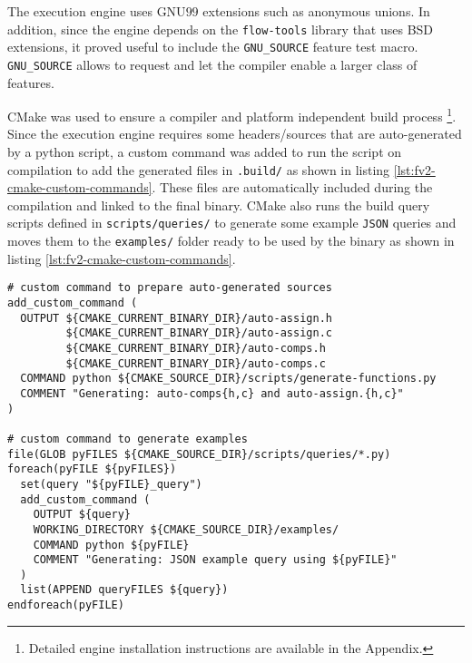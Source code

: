 The execution engine uses GNU$99$ extensions such as anonymous unions.  In
addition, since the engine depends on the \texttt{flow-tools} library that
uses BSD  extensions, it proved useful to
include the \texttt{GNU\_SOURCE} feature test macro.  \texttt{GNU\_SOURCE}
allows to request and let the compiler enable a larger class of features.

CMake \cite{masteringcmake:2008} was used to ensure a compiler and platform
independent build process \footnote{Detailed engine installation instructions
are available in the Appendix.}.  Since the execution engine requires some
headers/sources that are auto-generated by a python script, a custom command
was added to run the script on compilation to add the generated files
 in \texttt{.build/} as shown in listing
\ref{lst:fv2-cmake-custom-commands}. These files are automatically included
during the compilation and linked to the final binary.  CMake also runs the
build query scripts defined in \texttt{scripts/queries/} to generate some
example \texttt{JSON} queries and moves them to the \texttt{examples/} folder
ready to be used by the binary as shown in listing
\ref{lst:fv2-cmake-custom-commands}.

\begin{lstlisting}
# custom command to prepare auto-generated sources
add_custom_command (
  OUTPUT ${CMAKE_CURRENT_BINARY_DIR}/auto-assign.h
         ${CMAKE_CURRENT_BINARY_DIR}/auto-assign.c
         ${CMAKE_CURRENT_BINARY_DIR}/auto-comps.h
         ${CMAKE_CURRENT_BINARY_DIR}/auto-comps.c
  COMMAND python ${CMAKE_SOURCE_DIR}/scripts/generate-functions.py
  COMMENT "Generating: auto-comps{h,c} and auto-assign.{h,c}"
)

# custom command to generate examples
file(GLOB pyFILES ${CMAKE_SOURCE_DIR}/scripts/queries/*.py)
foreach(pyFILE ${pyFILES})
  set(query "${pyFILE}_query")
  add_custom_command (
    OUTPUT ${query}
    WORKING_DIRECTORY ${CMAKE_SOURCE_DIR}/examples/
    COMMAND python ${pyFILE}
    COMMENT "Generating: JSON example query using ${pyFILE}"
  )
  list(APPEND queryFILES ${query})
endforeach(pyFILE)
\end{lstlisting}

